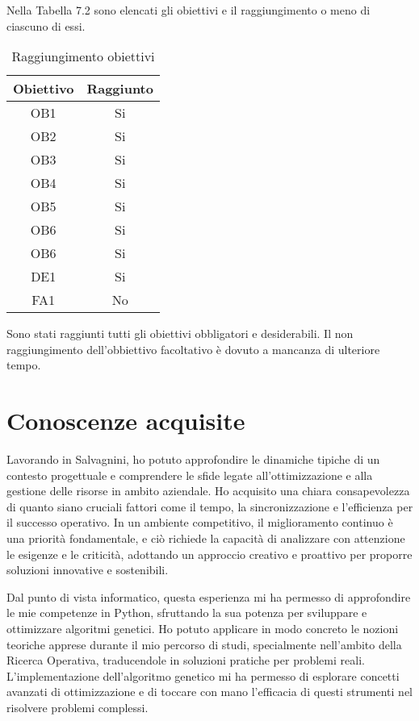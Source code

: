 Nella Tabella 7.2 sono elencati gli obiettivi e il raggiungimento o meno di ciascuno di essi.

\begin{table}[H]
    \centering
    \begin{tabular}{|c|c|}
    \hline
    \textbf{Obiettivo} & \textbf{Raggiunto} \\ \hline
    OB1 & Si \\ \hline
    OB2 & Si \\ \hline
    OB3 & Si \\ \hline
    OB4 & Si \\ \hline
    OB5 & Si \\ \hline
    OB6 & Si \\ \hline
    OB6 & Si \\ \hline
    DE1 & Si \\ \hline
    FA1 & No \\ \hline
    \end{tabular}
    \caption{Raggiungimento obiettivi}
\end{table}

Sono stati raggiunti tutti gli obiettivi obbligatori e desiderabili. Il non raggiungimento dell'obbiettivo facoltativo è dovuto a mancanza di ulteriore tempo.

\section{Conoscenze acquisite}

Lavorando in Salvagnini, ho potuto approfondire le dinamiche tipiche di un contesto progettuale e comprendere le sfide legate all'ottimizzazione e alla gestione delle risorse in ambito aziendale. Ho acquisito una chiara consapevolezza di quanto siano cruciali fattori come il tempo, la sincronizzazione e l'efficienza per il successo operativo. In un ambiente competitivo, il miglioramento continuo è una priorità fondamentale, e ciò richiede la capacità di analizzare con attenzione le esigenze e le criticità, adottando un approccio creativo e proattivo per proporre soluzioni innovative e sostenibili.

Dal punto di vista informatico, questa esperienza mi ha permesso di approfondire le mie competenze in Python, sfruttando la sua potenza per sviluppare e ottimizzare algoritmi genetici. Ho potuto applicare in modo concreto le nozioni teoriche apprese durante il mio percorso di studi, specialmente nell'ambito della Ricerca Operativa, traducendole in soluzioni pratiche per problemi reali. L'implementazione dell'algoritmo genetico mi ha permesso di esplorare concetti avanzati di ottimizzazione e di toccare con mano l’efficacia di questi strumenti nel risolvere problemi complessi.

